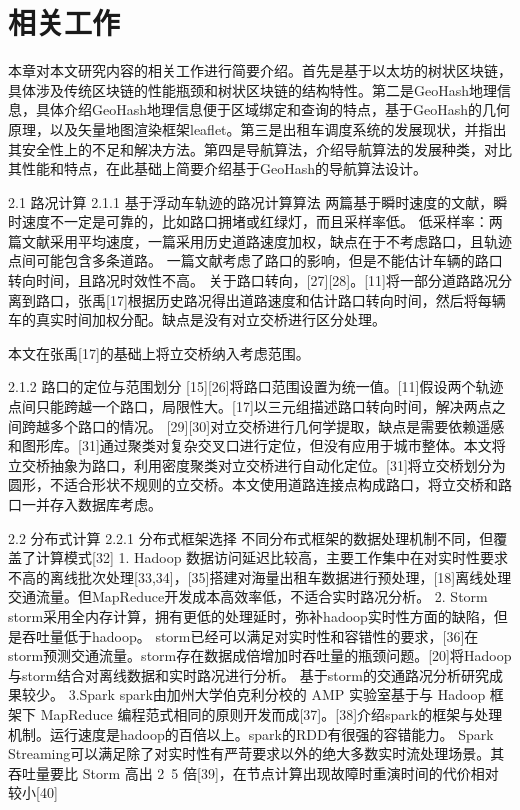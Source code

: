 \chapter{相关工作}
本章对本文研究内容的相关工作进行简要介绍。首先是基于以太坊的树状区块链，具体涉及传统区块链的性能瓶颈和树状区块链的结构特性。第二是GeoHash地理信息，具体介绍GeoHash地理信息便于区域绑定和查询的特点，基于GeoHash的几何原理，以及矢量地图渲染框架leaflet。第三是出租车调度系统的发展现状，并指出其安全性上的不足和解决方法。第四是导航算法，介绍导航算法的发展种类，对比其性能和特点，在此基础上简要介绍基于GeoHash的导航算法设计。\par


2.1 路况计算
2.1.1 基于浮动车轨迹的路况计算算法
两篇基于瞬时速度的文献，瞬时速度不一定是可靠的，比如路口拥堵或红绿灯，而且采样率低。
低采样率：两篇文献采用平均速度，一篇采用历史道路速度加权，缺点在于不考虑路口，且轨迹点间可能包含多条道路。
一篇文献考虑了路口的影响，但是不能估计车辆的路口转向时间，且路况时效性不高。
关于路口转向，[27][28]。[11]将一部分道路路况分离到路口，张禹[17]根据历史路况得出道路速度和估计路口转向时间，然后将每辆车的真实时间加权分配。缺点是没有对立交桥进行区分处理。

本文在张禹[17]的基础上将立交桥纳入考虑范围。

2.1.2 路口的定位与范围划分
[15][26]将路口范围设置为统一值。[11]假设两个轨迹点间只能跨越一个路口，局限性大。[17]以三元组描述路口转向时间，解决两点之间跨越多个路口的情况。
[29][30]对立交桥进行几何学提取，缺点是需要依赖遥感和图形库。[31]通过聚类对复杂交叉口进行定位，但没有应用于城市整体。本文将立交桥抽象为路口，利用密度聚类对立交桥进行自动化定位。[31]将立交桥划分为圆形，不适合形状不规则的立交桥。本文使用道路连接点构成路口，将立交桥和路口一并存入数据库考虑。

2.2 分布式计算
2.2.1 分布式框架选择
不同分布式框架的数据处理机制不同，但覆盖了计算模式[32]
1. Hadoop
数据访问延迟比较高，主要工作集中在对实时性要求不高的离线批次处理[33,34]，[35]搭建对海量出租车数据进行预处理，[18]离线处理交通流量。但MapReduce开发成本高效率低，不适合实时路况分析。
2. Storm
storm采用全内存计算，拥有更低的处理延时，弥补hadoop实时性方面的缺陷，但是吞吐量低于hadoop。
storm已经可以满足对实时性和容错性的要求，[36]在storm预测交通流量。storm存在数据成倍增加时吞吐量的瓶颈问题。[20]将Hadoop与storm结合对离线数据和实时路况进行分析。
基于storm的交通路况分析研究成果较少。
3.Spark
spark由加州大学伯克利分校的 AMP 实验室基于与 Hadoop 框架下 MapReduce 编程范式相同的原则开发而成[37]。[38]介绍spark的框架与处理机制。运行速度是hadoop的百倍以上。spark的RDD有很强的容错能力。
Spark Streaming可以满足除了对实时性有严苛要求以外的绝大多数实时流处理场景。其吞吐量要比 Storm 高出 2~5 倍[39]，在节点计算出现故障时重演时间的代价相对较小[40]

